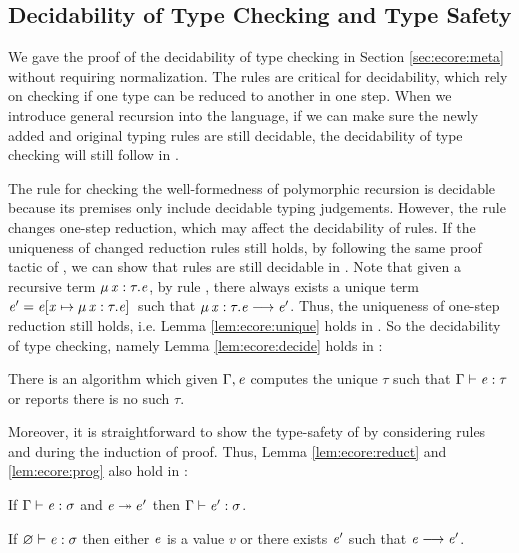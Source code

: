 \subsection{Decidability of Type Checking and Type Safety}\label{sec:rec:meta}
We gave the proof of the decidability of type checking \ecore in
Section \ref{sec:ecore:meta} without requiring normalization. The
\cast rules are critical for decidability, which rely on checking if
one type can be reduced to another in one step. When we introduce
general recursion into the language, if we can make sure the newly
added and original typing rules are still decidable, the decidability
of type checking will still follow in \name.

The rule  for checking the well-formedness of
polymorphic recursion is decidable because its premises only include
decidable typing judgements. However, the rule  changes
one-step reduction, which may affect the decidability of \cast
rules. If the uniqueness of changed reduction rules still holds, by
following the same proof tactic of \ecore, we can show that \cast
rules are still decidable in \name. Note that given a recursive term
$\mu \, \mathit{x}  :  \tau  .  \mathit{e}$, by rule , there always exists a unique
term $\mathit{e'}=\mathit{e}  [  \mathit{x}  \mapsto  \mu \, \mathit{x}  :  \tau  .  \mathit{e}  ] \,$ such that $\mu \, \mathit{x}  :  \tau  .  \mathit{e}  \longrightarrow  \mathit{e'}$. Thus, the uniqueness of one-step reduction still holds,
i.e. Lemma \ref{lem:ecore:unique} holds in \name. So the decidability
of type checking, namely Lemma \ref{lem:ecore:decide} holds in \name:

\begin{thm}\label{lem:rec:decide}
	There is an algorithm which given $\Gamma, \mathit{e}$ computes the
        unique $\tau$ such that $\Gamma  \vdash  \mathit{e}  :  \tau$ or reports there is no
        such $\tau$.
\end{thm}

Moreover, it is straightforward to show the type-safety of \name by
considering rules  and  during the
induction of proof. Thus, Lemma \ref{lem:ecore:reduct} and
\ref{lem:ecore:prog} also hold in \name:

\begin{thm}\label{lem:rec:reduct}
If $\Gamma  \vdash  \mathit{e}  :  \sigma$ and $\mathit{e}  \twoheadrightarrow  e'$ then $\Gamma  \vdash  \mathit{e'}  :  \sigma$.
\end{thm}

\begin{thm}[Progress]\label{lem:rec:prog}
If $\varnothing  \vdash  \mathit{e}  :  \sigma$ then either $\mathit{e}$ is a value $v$ or there
exists $\mathit{e}'$ such that $\mathit{e}  \longrightarrow  \mathit{e'}$.
\end{thm}
